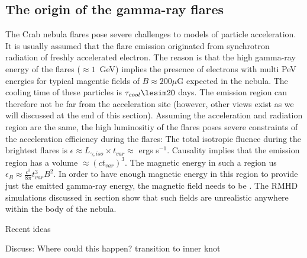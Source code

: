 \subsection{The origin of the gamma-ray flares}

The Crab nebula flares pose severe challenges to models of particle acceleration. It is usually assumed that the flare emission originated from synchrotron radiation of freshly accelerated electron. The reason is that the high gamma-ray energy of the flares ($\approx 1$~GeV) implies the presence of electrons with multi PeV energies for typical magentic fields of $B \approx 200 \mu$G expected in the nebula. The cooling time of these particles is $\tau_{cool} \lesim 20$ days. The emission region can therefore not be far from the acceleration site (however, other views exist as we will discussed at the end of this section). Assuming the acceleration and radiation region are the same, the high luminositiy of the flares poses severe constraints of the acceleration efficiency during the flares: The total isotropic fluence during the brightest flares is $\epsilon \approx L_{\gamma,iso} \times t_{var} \approx $ ergs s$^{-1}$. Causality implies that the emission region has a volume $\approx (c t_{var})^3$. The magnetic energy in such a region us $\epsilon_B \approx \frac{c^3}{8 \pi} t_{var}^3 B^2$. In order to have enough magnetic energy in this region to provide just the emitted gamma-ray energy, the magnetic field needs to be . The RMHD simulations discussed in section show that such fields are unrealistic anywhere within the body of the nebula. 


Recent ideas  \cite{Bykov_2012}\cite{Cerutti_2014}\cite{2016arXiv160403179Y}\cite{2015arXiv151205426Z}\cite{2016arXiv160304850N}\cite{2016arXiv160305731L}

Discuss: Where could this happen? transition to inner knot